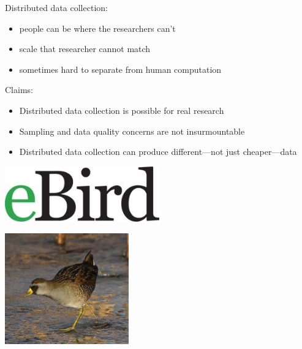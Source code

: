 \documentclass[aspectratio=169]{beamer}
\begin{document}
\begin{frame}

Distributed data collection:
\begin{itemize}
\item people can be where the researchers can't
\pause
\item scale that researcher cannot match
\pause
\item sometimes hard to separate from human computation
\end{itemize}

\end{frame}
\begin{frame}

Claims:
\begin{itemize}
\item Distributed data collection is possible for real research
\pause
\item Sampling and data quality concerns are not insurmountable 
\pause
\item Distributed data collection can produce different---not just cheaper---data 
\end{itemize}

\end{frame}
\begin{frame}

\begin{center}
\includegraphics[width=0.5\textwidth]{figures/ebird_logo}
\end{center}
\begin{center}
\includegraphics[width=0.4\textwidth]{figures/bird_flickr_webirdtoo}
\end{center}

\end{frame}
\end{document}
